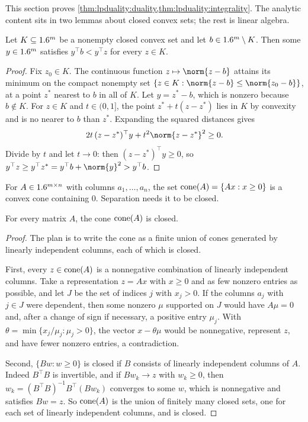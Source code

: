 \begin{refsection}
This section proves \cref{thm:lpduality:duality,thm:lpduality:integrality}. The analytic content sits in two lemmas about closed convex sets; the rest is linear algebra.

\begin{lemma}[Separation]\label{lem:lpduality:separation}
Let $K\subseteq1.6^m$ be a nonempty closed convex set and let $b\in1.6^m\setminus K$. Then some $y\in1.6^m$ satisfies $y^\top b<y^\top z$ for every $z\in K$.
\end{lemma}

\begin{proof}
Fix $z_0\in K$. The continuous function $z\mapsto\norm{z-b}$ attains its minimum on the compact nonempty set $\{z\in K:\norm{z-b}\le\norm{z_0-b}\}$, at a point $z^*$ nearest to $b$ in all of $K$. Let $y=z^*-b$, which is nonzero because $b\notin K$. For $z\in K$ and $t\in(0,1]$, the point $z^*+t(z-z^*)$ lies in $K$ by convexity and is no nearer to $b$ than $z^*$. Expanding the squared distances gives
\[
2t\,(z-z^*)^\top y+t^2\norm{z-z^*}^2\ge0 .
\]
Divide by $t$ and let $t\to0$: then $(z-z^*)^\top y\ge0$, so $y^\top z\ge y^\top z^*=y^\top b+\norm{y}^2>y^\top b$.
\end{proof}

For $A\in1.6^{m\times n}$ with columns $a_1,\dots,a_n$, the set $\operatorname{cone}(A)=\{Ax:x\ge0\}$ is a convex cone containing $0$. Separation needs it to be closed.

\begin{lemma}\label{lem:lpduality:cone}
For every matrix $A$, the cone $\operatorname{cone}(A)$ is closed.
\end{lemma}

\begin{proof}
The plan is to write the cone as a finite union of cones generated by linearly independent columns, each of which is closed.

First, every $z\in\operatorname{cone}(A)$ is a nonnegative combination of linearly independent columns. Take a representation $z=Ax$ with $x\ge0$ and as few nonzero entries as possible, and let $J$ be the set of indices $j$ with $x_j>0$. If the columns $a_j$ with $j\in J$ were dependent, then some nonzero $\mu$ supported on $J$ would have $A\mu=0$ and, after a change of sign if necessary, a positive entry $\mu_j$. With $\theta=\min\{x_j/\mu_j:\mu_j>0\}$, the vector $x-\theta\mu$ would be nonnegative, represent $z$, and have fewer nonzero entries, a contradiction.

Second, $\{Bw:w\ge0\}$ is closed if $B$ consists of linearly independent columns of $A$. Indeed $B^\top B$ is invertible, and if $Bw_k\to z$ with $w_k\ge0$, then $w_k=(B^\top B)^{-1}B^\top(Bw_k)$ converges to some $w$, which is nonnegative and satisfies $Bw=z$. So $\operatorname{cone}(A)$ is the union of finitely many closed sets, one for each set of linearly independent columns, and is closed.
\end{proof}


\end{refsection}
